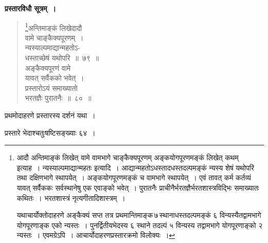 \documentclass[11pt, openany]{book}
\begin{document}
\newpage

\textbf{प्रस्तारविधौ सूत्रम्~। }

\begin{quote}
\renewcommand{\thefootnote}{१}\footnote{आदौ अन्तिमाङ्कं लिखेत् वामे वामभागे चाङ्कैक्यपूरणम् अङ्कयोगपूरणमङ्कं लिखेत् कथम् इत्याह~। न्यस्याल्पमाद्यान्महतः इत्यादि~। आद्यान्महतोऽधस्तादधस्तदल्पमङ्कं न्यस्य शेषं यथोपरि तथा दक्षिणभागे स्थापयेत्~। अङ्कयोगपूरणमङ्कं च वामभागे स्थापयेत्~। एवं तावत् कर्म कर्तव्यं यावत् सर्वैककः सर्वस्थानेषु एक एवाङ्को भवेत्~। पुरातनैः प्राचीनैर्भरतज्ञैर्भरतशास्त्रविद्भिः समाख्यातः कथितः~। भरतशास्त्रं नृत्यगीतादिशास्त्रम्~। 

\hspace{3mm} यथाचार्योक्तोदाहरणे अङ्कैक्यं सप्त तत्र प्रथमान्तिमाङ्क\textendash \,७\textendash \,स्थानाधस्तदल्पमङ्कं ६ विन्यस्यैतद्वामभागे योगपूरणाङ्क एको न्यस्तः~। पुनर्द्वितीयभेदस्य ६ स्थाने तदल्पं ५ विन्यस्य तद्वामभागे योगपूरणाङ्को २ न्यस्तः~। एवमग्रेऽपि~। आचार्योदाहरणप्रस्तारक्रमो विलोक्यः~।}{\gk अन्तिमाङ्कं लिखेदादौ\\
वामे चाङ्कैक्यपूरणम्~।\\
न्यस्याल्पमाद्यान्महतोऽ-\\
धस्ताच्छेषं यथोपरि~॥~७९~॥\\
अङ्कैक्यपूरणं वामे\\
यावत् सर्वैकको भवेत्~।\\
प्रस्तारोऽयं समाख्यातो\\
भरतज्ञैः पुरातनैः~॥~८०~॥}
\end{quote}

\newpage

प्रथमोदाहरणे प्रस्तारस्य दर्शनं यथा~।
\vspace{2mm}

प्रस्तारे भेदाश्चतुःषष्टिसङ्ख्याः ६४~।\\
\end{document}
